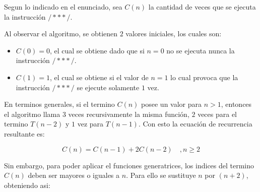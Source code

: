 
\begin{solution}
Segun lo indicado en el enunciado, sea $C(n)$ la cantidad de veces que se ejecuta la instrucción $/***/$. 

Al observar el algoritmo, se obtienen $2$ valores iniciales, los cuales son: 
\begin{itemize}
    \item $C(0)=0$, el cual se obtiene dado que si $n=0$ no se ejecuta nunca la instrucción $/***/$.
    \item $C(1)=1$, el cual se obtiene si el valor de $n=1$ lo cual provoca que la instrucción $/***/$ se ejecute solamente $1$ vez.
\end{itemize}

En terminos generales, si el termino $C(n)$ posee un valor para $n > 1$, entonces el algoritmo llama $3$ veces recursivamente la misma función, $2$ veces para el termino $T(n-2)$ y $1$ vez para $T(n-1)$. Con esto la ecuación de recurrencia resultante es:

$$C(n) = C(n-1) + 2C(n-2) \quad , n \ge 2$$

Sin embargo, para poder aplicar el funciones generatrices, los indices del termino $C(n)$ deben ser mayores o iguales a $n$. Para ello se sustituye $n$ por $(n+2)$, obteniendo asi:


\end{solution}
